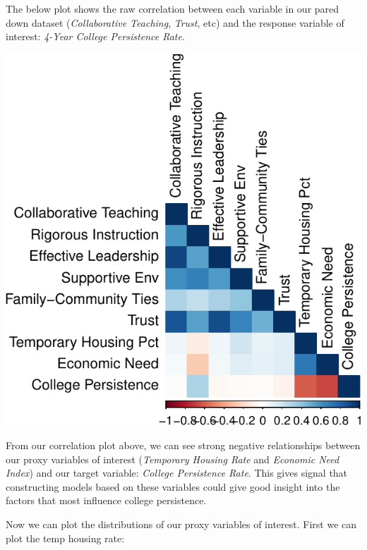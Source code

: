 \documentclass[
  man]{apa6}
\begin{document}
The below plot shows the raw correlation between each variable in our pared down dataset (\emph{Collaborative Teaching}, \emph{Trust}, etc) and the response variable of interest: \emph{4-Year College Persistence Rate}.

\includegraphics{final-project_files/figure-latex/unnamed-chunk-3-1.pdf}

From our correlation plot above, we can see strong negative relationships between our proxy variables of interest (\emph{Temporary Housing Rate} and \emph{Economic Need Index}) and our target variable: \emph{College Persistence Rate}. This gives signal that constructing models based on these variables could give good insight into the factors that most influence college persistence.

Now we can plot the distributions of our proxy variables of interest. First we can plot the temp housing rate:
\end{document}
